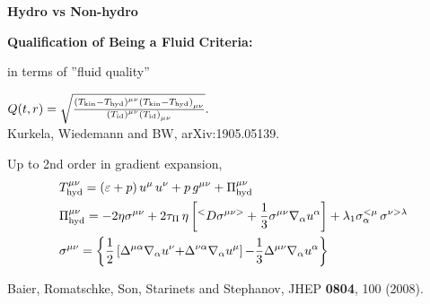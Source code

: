 \documentclass[9pt,a4paper,unknownkeysallowed,xcolor=dvipsnames,aspectratio=43]{beamer}
\begin{document}
%
%
\begin{frame}
\setcounter{page}{0}
\vspace*{\fill}
\begin{center}
{\Huge\bf\color{gray} Hydro vs Non-hydro}
\end{center}
\vspace*{\fill}
\end{frame}
\setcounter{page}{13}
%
%
%

\begin{frame}{\bf\huge Qualification of Being a Fluid}
\vspace{4mm}
{\color{darkred}\bf\LARGE Criteria:}
\vspace{4mm}
\begin{center}
{\huge\color{darkred}
}
\end{center}
\vspace{4mm}
{\Large \color{black} in terms of  ''fluid quality''}
\begin{center}
{\Large\color{black}
{
$Q(t,r) =  \sqrt{  \frac{ \left( T_{\rm kin}- T_{\rm hyd} \right)^{\mu\nu}   \left( T_{\rm kin} - T_{\rm hyd} \right)_{\mu\nu} }{ \left(T_{\rm id} \right)^{\mu\nu}    \left(T_{\rm id} \right)_{\mu\nu}    }  }.$
}
}
\vspace{2mm}\\
{\tiny  {\color{teablue} Kurkela, Wiedemann and BW, arXiv:1905.05139.
  }
  }
\end{center}
\vspace{2mm}
{\color{black}\Large Up to 2nd order in gradient expansion, }
\begin{align}
&T_{\rm hyd}^{\mu\nu} = \left( \varepsilon + p\right) u^\mu\, u^\nu + p\, g^{\mu\nu} + \Pi^{\mu\nu}_{\rm hyd}\nonumber\\
&\Pi^{\mu\nu}_{\rm hyd} = - 2 \eta \sigma^{\mu\nu}+ 2 \tau_{\Pi}\, \eta \left[ ^<D\sigma^{\mu\nu>} 
	+ \frac{1}{3} \sigma^{\mu\nu} \nabla_\alpha u^\alpha \right] +	\lambda_1 \sigma^{<\mu}_\alpha\, \sigma^{\nu> \lambda} \nonumber\\
&\sigma^{\mu\nu} =  \left\{\frac{1}{2}\left[ \Delta^{\mu\alpha} \nabla_\alpha u^\nu {+} \Delta^{\nu\alpha} \nabla_\alpha u^\mu \right] 
				{-} \frac{1}{3}\Delta^{\mu\nu} \nabla_\alpha u^\alpha \right\}\nonumber
\end{align}
\begin{center}
\vspace{2mm}
{\tiny  {\color{teablue}   Baier, Romatschke, Son, Starinets and Stephanov,
  JHEP {\bf 0804}, 100 (2008).
  }
  }
  \end{center}
\end{frame}
\end{document}
